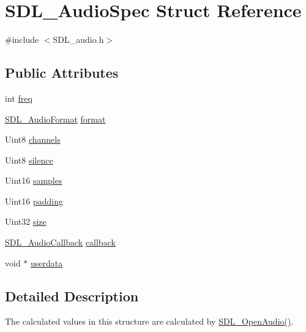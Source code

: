 \hypertarget{struct_s_d_l___audio_spec}{}\section{S\+D\+L\+\_\+\+Audio\+Spec Struct Reference}
\label{struct_s_d_l___audio_spec}


{\ttfamily \#include $<$S\+D\+L\+\_\+audio.\+h$>$}

\subsection*{Public Attributes}
\begin{DoxyCompactItemize}
\item 
int \mbox{\hyperlink{struct_s_d_l___audio_spec_a8b823ce46fc2e448cf7e6fc141aff6b2}{freq}}
\item 
\mbox{\hyperlink{_s_d_l__audio_8h_a491ed103fd25d920c4e6b7495217ce66}{S\+D\+L\+\_\+\+Audio\+Format}} \mbox{\hyperlink{struct_s_d_l___audio_spec_ae37c634cac5807762f184c8d5d49fc2d}{format}}
\item 
Uint8 \mbox{\hyperlink{struct_s_d_l___audio_spec_a31fe8b3710cf23bbef24be8a1749fe46}{channels}}
\item 
Uint8 \mbox{\hyperlink{struct_s_d_l___audio_spec_addc462c8a806e6c122eccf63482048f6}{silence}}
\item 
Uint16 \mbox{\hyperlink{struct_s_d_l___audio_spec_a2cdf5e885808c10bfa2810b706e69f95}{samples}}
\item 
Uint16 \mbox{\hyperlink{struct_s_d_l___audio_spec_a738371fc13b54cefef4db16994abeeb6}{padding}}
\item 
Uint32 \mbox{\hyperlink{struct_s_d_l___audio_spec_a154cf44743ecec78c36dc6c827dd2fdb}{size}}
\item 
\mbox{\hyperlink{_s_d_l__audio_8h_a379fcc25845e46bfa80cb3619fc2821c}{S\+D\+L\+\_\+\+Audio\+Callback}} \mbox{\hyperlink{struct_s_d_l___audio_spec_a1f8d05139f1679dcf359f49251233eac}{callback}}
\item 
void $\ast$ \mbox{\hyperlink{struct_s_d_l___audio_spec_aeec9481666f5f0982c98d3878f175d9b}{userdata}}
\end{DoxyCompactItemize}


\subsection{Detailed Description}
The calculated values in this structure are calculated by \mbox{\hyperlink{_s_d_l__audio_8h_a2edf30e7747584e28041b4986f89f440}{S\+D\+L\+\_\+\+Open\+Audio()}}.

